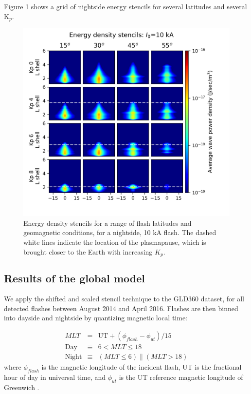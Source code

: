 Figure \ref{fig:energy_stencils} shows a grid of nightside energy stencils for several latitudes and several K$_p$.

\begin{figure}[h!]
\begin{center}
\includegraphics{figures/wave_energy_vs_L_stencils.png}
\caption[Energy density stencils]{Energy density stencils for a range of flash latitudes and geomagnetic conditions, for a nightside, 10 kA flash. The dashed white lines indicate the location of the plasmapause, which is brought closer to the Earth with increasing $K_p$.}
\label{fig:energy_stencils}
\end{center}
\end{figure}

\subsection{Results of the global model}
We apply the shifted and scaled stencil technique to the GLD360 dataset, for all detected flashes between August 2014 and April 2016. Flashes are then binned into dayside and nightside by quantizing magnetic local time:

\begin{eqnarray}
\label{eqn:MLT}
MLT & = & \mathrm{UT} + (\phi_{flash} - \phi_{ut})/15 \\
\mathrm{Day} & \equiv & 6 < MLT \leq 18 \\
\mathrm{Night} & \equiv & (MLT \leq 6) \parallel (MLT > 18)
\end{eqnarray}
\noindent where $\phi_{flash}$ is the magnetic longitude of the incident flash, UT is the fractional hour of day in universal time, and $\phi_{ut}$ is the UT reference magnetic longitude of Greenwich \citep{Laundal2016}.

